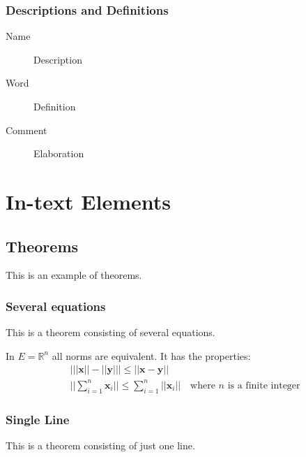 \documentclass[11pt,fleqn,a5paper]{book} %
\begin{document}
    \subsection{Descriptions and Definitions}
    
    \begin{description}
    \item[Name] Description
    \item[Word] Definition
    \item[Comment] Elaboration
    \end{description}
    
    
    \chapter{In-text Elements}
    
    \section{Theorems}
    
    This is an example of theorems.
    
    \subsection{Several equations}
    This is a theorem consisting of several equations.
    
    \begin{theorem}
    In $E=\mathbb{R}^n$ all norms are equivalent. It has the properties:
    \begin{align}
    & \big| ||\mathbf{x}|| - ||\mathbf{y}|| \big|\leq || \mathbf{x}- \mathbf{y}||\\
    &  ||\sum_{i=1}^n\mathbf{x}_i||\leq \sum_{i=1}^n||\mathbf{x}_i||\quad\text{where $n$ is a finite integer}
    \end{align}
    \end{theorem}
    
    \subsection{Single Line}
    This is a theorem consisting of just one line.
    
\end{document}
